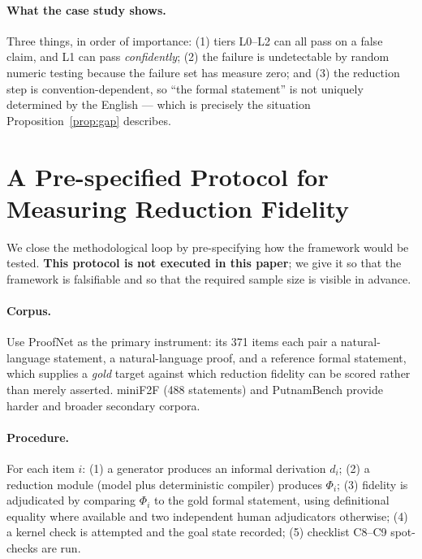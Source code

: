 \documentclass[11pt,a4paper]{article}
\theoremstyle{plain}
\theoremstyle{remark}
\begin{document}
\paragraph{What the case study shows.}  Three things, in order of importance:
(1) tiers L0--L2 can all pass on a false claim, and L1 can pass
\emph{confidently}; (2) the failure is undetectable by random numeric testing
because the failure set has measure zero; and (3) the reduction step is
convention-dependent, so ``the formal statement'' is not uniquely determined by
the English --- which is precisely the situation Proposition~\ref{prop:gap}
describes.

\section{A Pre-specified Protocol for Measuring Reduction Fidelity}
\label{sec:protocol}

We close the methodological loop by pre-specifying how the framework would be
tested.  \textbf{This protocol is not executed in this paper}; we give it so
that the framework is falsifiable and so that the required sample size is
visible in advance.

\paragraph{Corpus.}  Use ProofNet \cite{azerbayev2023proofnet} as the primary
instrument: its 371 items each pair a natural-language statement, a natural-language
proof, and a reference formal statement, which supplies a \emph{gold} target
against which reduction fidelity can be scored rather than merely asserted.
miniF2F \cite{han2022minif2f} (488 statements) and PutnamBench
\cite{tsoukalas2024putnambench} provide harder and broader secondary corpora.

\paragraph{Procedure.}  For each item $i$: (1) a generator produces an informal
derivation $d_i$; (2) a reduction module (model plus deterministic compiler)
produces $\Phi_i$; (3) fidelity is adjudicated by comparing $\Phi_i$ to the gold
formal statement, using definitional equality where available and two
independent human adjudicators otherwise; (4) a kernel check is attempted and
the goal state recorded; (5) checklist C8--C9 spot-checks are run.
\end{document}
